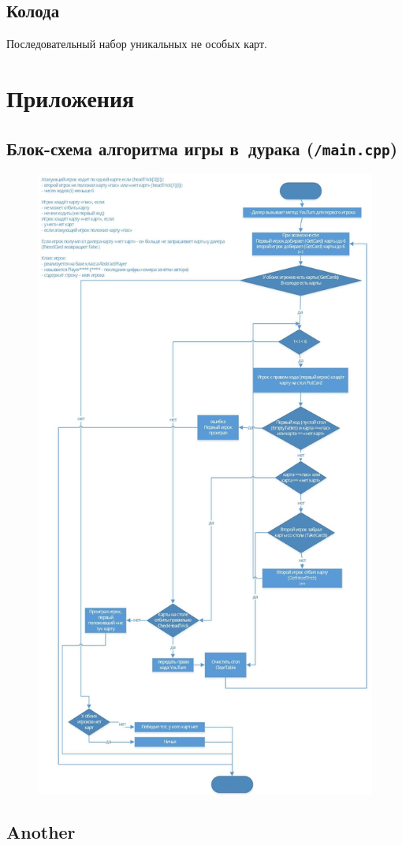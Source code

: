 \documentclass[a4paper,12pt]{article}
\begin{document}
        \subsection{Колода}
            Последовательный набор уникальных не особых карт. 

    \newpage
    \section{Приложения}
    \hypertarget{rulesimg}{\subsection{Блок-схема алгоритма игры в~дурака (\texttt{/main.cpp})}}
    \begin{figure}[h!]
        \center
        \includegraphics[height=0.9\textheight]{rules.jpg}
    \end{figure}
    \newpage
    \subsection{Another}
\end{document}
